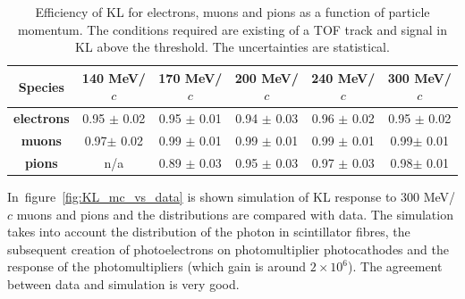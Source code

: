        
  \begin{table}[htb]
  	\begin{center}
  		\begin{tabular}{c|c|c|c|c|c} 
  			\hline
  			\textbf{Species} &\textbf{140 MeV/$c$} & \textbf{170 MeV/$c$} & \textbf{200 MeV/$c$}	&\textbf{240 MeV/$c$} &\textbf{300 MeV/$c$}\\
  			\hline
  			\textbf{electrons} & 0.95 $\pm$ 0.02  & 0.95 $\pm$ 0.01 & 0.94 $\pm$ 0.03 &  0.96 $\pm$ 0.02 &  0.95 $\pm$ 0.02 \\
  			\hline
  			\textbf{muons} &  0.97$\pm$ 0.02 & 0.99 $\pm$ 0.01  & 0.99 $\pm$  0.01 & 0.99 $\pm$ 0.01 & 0.99$\pm$ 0.01\\
  			\hline
  			\textbf{pions} &  n/a  & 0.89 $\pm$ 0.03  & 0.95 $\pm$ 0.03 & 0.97 $\pm$ 0.03 & 0.98$\pm$ 0.01\\
  			\hline
  		\end{tabular}
  		\caption{Efficiency of KL for electrons, muons and pions as a function of particle momentum. The conditions required are existing of a TOF track and signal in KL above the threshold. The uncertainties are statistical.}
  		\label{tab:KL_eff}
  	\end{center}
  \end{table}

In~figure~\ref{fig:KL_mc_vs_data} is shown simulation of KL response to 300 MeV/$c$ muons and pions and the distributions are compared with data.
The simulation takes into account the distribution of the photon in scintillator fibres, the subsequent creation of photoelectrons on photomultiplier photocathodes and the response of the photomultipliers (which gain is around $2 \times 10^6$).
The agreement between data and simulation is very good.


